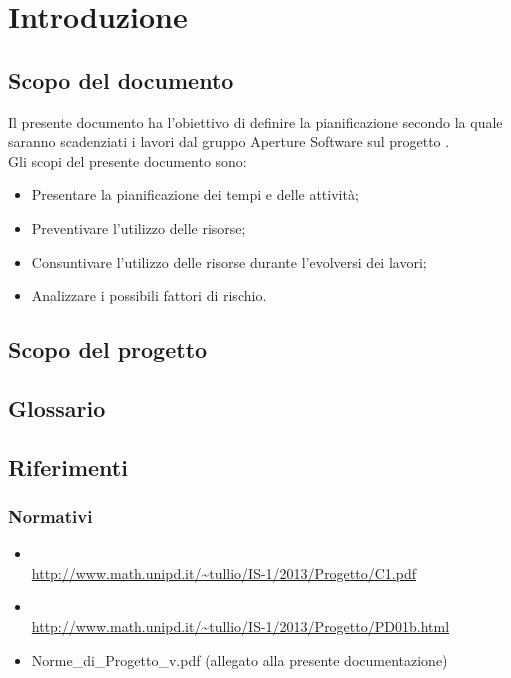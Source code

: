 \newpage
\section{Introduzione}
\label{2.0}
\subsection{Scopo del documento}
\label{2.1}
Il presente documento ha l'obiettivo di definire la pianificazione secondo la quale saranno scadenziati i lavori dal gruppo Aperture Software sul progetto \Progetto{}.\\

Gli scopi del presente documento sono:
\begin{itemize}
\item Presentare la pianificazione dei tempi e delle attività;
\item Preventivare l'utilizzo delle risorse;
\item Consuntivare l'utilizzo delle risorse durante l'evolversi dei lavori;
\item Analizzare i possibili fattori di rischio.
\end{itemize}

\subsection{Scopo del progetto}
\label{2.2}
\Prodotto{}

\subsection{Glossario}
\label{2.3}
\Glossario{}

\subsection{Riferimenti}
\label{2.4}
\subsubsection{Normativi}
\label{2.4.1}
\begin{itemize}
\item {}\\ \url{http://www.math.unipd.it/~tullio/IS-1/2013/Progetto/C1.pdf}
\item {}\\ \url{http://www.math.unipd.it/~tullio/IS-1/2013/Progetto/PD01b.html}
\item {} Norme\_{}di\_{}Progetto\_{}v\versioneNormeDiProgetto{}.pdf  (allegato alla presente documentazione)\\
\end{itemize}

